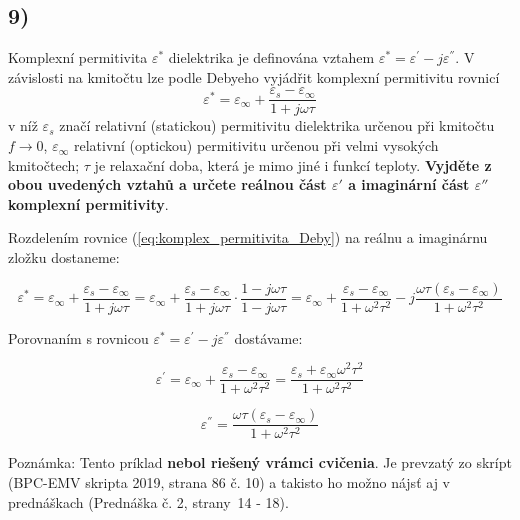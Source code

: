\newpage


\subsection*{9)}
Komplexní permitivita $\varepsilon^*$ dielektrika je definována vztahem ${\varepsilon^{*}}={\varepsilon^{'}}-{j\varepsilon^{''}}$. V závislosti na kmitočtu lze podle Debyeho vyjádřit komplexní permitivitu rovnicí
\begin{equation}
    {\varepsilon^{*}}={\varepsilon_\infty}+\frac{{\varepsilon_s}-{\varepsilon_\infty}}{1+j\omega\tau}
    \label{eq:komplex_permitivita_Deby}
\end{equation}
v níž $\varepsilon_s$ značí relativní (statickou) permitivitu dielektrika určenou při kmitočtu $f\rightarrow 0$, $\varepsilon_\infty$ relativní (optickou) permitivitu určenou při velmi vysokých kmitočtech; $\tau$ je relaxační doba, která je mimo jiné i funkcí teploty. \textbf{Vyjděte z obou uvedených vztahů
a určete reálnou část $\varepsilon{'}$ a imaginární část $\varepsilon{''}$ komplexní permitivity}.

Rozdelením rovnice (\ref{eq:komplex_permitivita_Deby}) na reálnu a imaginárnu zložku dostaneme:

\begin{equation*}
    {\varepsilon^{*}}={\varepsilon_\infty}+\frac{{\varepsilon_s}-{\varepsilon_\infty}}{1+j\omega\tau}={\varepsilon_\infty}+\frac{{\varepsilon_s}-{\varepsilon_\infty}}{1+j\omega\tau}\cdot\frac{1-j\omega\tau}{1-j\omega\tau}={\varepsilon_\infty}+\frac{{\varepsilon_s}-{\varepsilon_\infty}}{1+{\omega}^2{\tau}^2}-j \frac{\omega\tau({\varepsilon_s}-{\varepsilon_\infty})}{1+{\omega}^2{\tau}^2}
\end{equation*}

Porovnaním s rovnicou ${\varepsilon^{*}}={\varepsilon^{'}}-{j\varepsilon^{''}}$ dostávame:

\begin{equation*}
    {\varepsilon^{'}}={\varepsilon_\infty}+\frac{{\varepsilon_s}-{\varepsilon_\infty}}{1+{\omega}^2{\tau}^2}=\frac{{\varepsilon_s}+{\varepsilon_\infty}{\omega}^2{\tau}^2}{1+{\omega}^2{\tau}^2} \tag{Reálna časť}
\end{equation*}

\begin{equation*}
    {\varepsilon^{''}}=\frac{\omega\tau({\varepsilon_s}-{\varepsilon_\infty})}{1+{\omega}^2{\tau}^2} \tag{Imaginárna časť}
\end{equation*}

\color{red}Poznámka: Tento príklad \textbf{nebol riešený vrámci cvičenia}. Je prevzatý zo skrípt (BPC-EMV skripta 2019, strana 86 č. 10) a takisto ho možno nájsť aj v prednáškach (Prednáška č. 2, strany~14 - 18). \\

\color{black}



